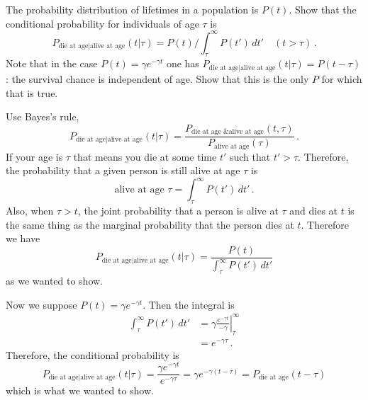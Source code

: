 

The probability distribution of lifetimes in a population is $P(t)$.
Show that the conditional probability for individuals of age $\tau$ is
\begin{equation*}
P_{\text{die at age}|\text{alive at age}}(t | \tau) = P(t) / \int_\tau^\infty P(t') \, dt' \quad (t > \tau) \, .
\end{equation*}
Note that in the case $P(t) = \gamma e^{-\gamma t}$ one has $P_{\text{die at age}|\text{alive at age}}(t|\tau) = P(t - \tau)$: the survival chance is independent of age.
Show that this is the only $P$ for which that is true.


Use Bayes's rule,
\begin{equation*}
P_{\text{die at age}|\text{alive at age}}(t | \tau)
= \frac{P_{\text{die at age \& alive at age}}(t, \tau)}{P_{\text{alive at age}}(\tau)} \, .
\end{equation*}
If your age is $\tau$ that means you die at some time $t'$ such that $t' > \tau$.
Therefore, the probability that a given person is still alive at age $\tau$ is
\begin{equation*}
\text{alive at age }\tau = \int_\tau^\infty P(t') \, dt' \, .
\end{equation*}
Also, when $\tau > t$, the joint probability that a person is alive at $\tau$ and dies at $t$ is the same thing as the marginal probability that the person dies at $t$.
Therefore we have
\begin{equation*}
P_{\text{die at age}|\text{alive at age}}(t | \tau)
= \frac{P(t)}{\int_\tau^\infty P(t') \, dt'}
\end{equation*}
as we wanted to show.

Now we suppose $P(t) = \gamma e^{-\gamma t}$.
Then the integral is
\begin{align*}
\int_\tau^\infty P(t') \, dt'
&= \gamma \left. \frac{e^{-\gamma t}}{-\gamma} \right|_\tau^\infty \\
&= e^{-\gamma \tau} \, .
\end{align*}
Therefore, the conditional probability is
\begin{equation*}
P_{\text{die at age}|\text{alive at age}}(t | \tau)
= \frac{\gamma e^{-\gamma t}}{e^{-\gamma \tau}} = \gamma e^{-\gamma (t - \tau)}
= P_\text{die at age} ( t - \tau)
\end{equation*}
which is what we wanted to show.

